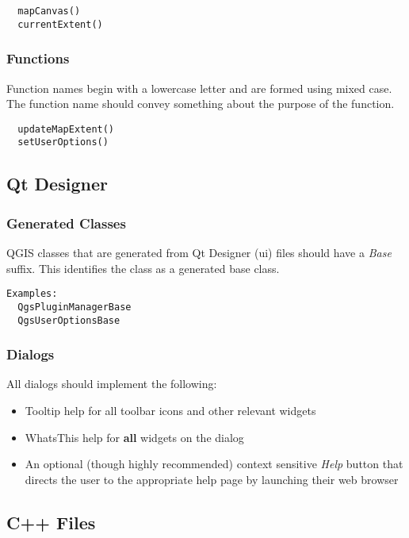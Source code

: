 \begin{verbatim}
  mapCanvas()
  currentExtent()
\end{verbatim}

\hypertarget{toc6}{}
\subsubsection{Functions}
Function names begin with a lowercase letter and are formed using mixed case.
The function name should convey something about the purpose of the function.

\begin{verbatim}
  updateMapExtent()
  setUserOptions()
\end{verbatim}

\hypertarget{toc7}{}
\subsection{Qt Designer}
\hypertarget{toc8}{}
\subsubsection{Generated Classes}
QGIS classes that are generated from Qt Designer (ui) files should have a
\textit{Base} suffix. This identifies the class as a generated base class.

\begin{verbatim}
Examples:
  QgsPluginManagerBase
  QgsUserOptionsBase
\end{verbatim}
\hypertarget{toc9}{}
\subsubsection{Dialogs}

All dialogs should implement the following:

\begin{itemize}
\item Tooltip help for all toolbar icons and other relevant widgets
\item WhatsThis help for \textbf{all} widgets on the dialog
\item An optional (though highly recommended) context sensitive \textit{Help} button
   that directs the user to the appropriate help page by launching their web
   browser
\end{itemize}

\hypertarget{toc10}{}
\subsection{C++ Files}
\hypertarget{toc11}{}
